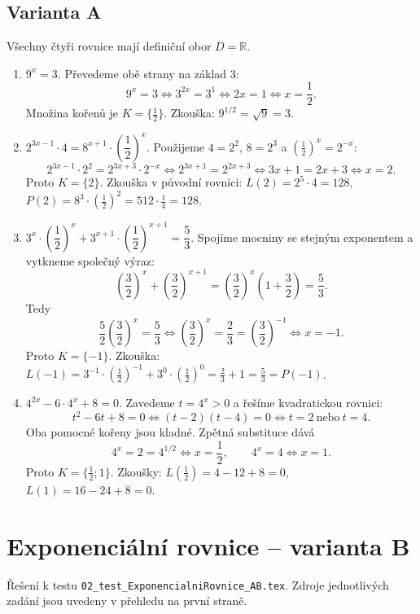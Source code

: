 \documentclass[a4paper,10pt]{article}
\begin{document}
\subsection*{Varianta A}
Všechny čtyři rovnice mají definiční obor $D=\mathbb{R}$.
\begin{enumerate}
\item $9^x = 3$.
Převedeme obě strany na základ $3$:
\[
9^x=3 \iff 3^{2x}=3^1 \iff 2x=1 \iff x=\frac12.
\]
Množina kořenů je $K=\{\frac12\}$.
Zkouška: $9^{1/2}=\sqrt{9}=3$.

\item $2^{3x-1} \cdot 4 = 8^{x+1} \cdot \left(\dfrac{1}{2}\right)^{x}$.
Použijeme $4=2^2$, $8=2^3$ a $(\frac12)^x=2^{-x}$:
\[
2^{3x-1}\cdot2^2=2^{3x+3}\cdot2^{-x}
\iff 2^{3x+1}=2^{2x+3}
\iff 3x+1=2x+3 \iff x=2.
\]
Proto $K=\{2\}$.
Zkouška v původní rovnici: $L(2)=2^5\cdot4=128$,
$P(2)=8^3\cdot(\frac12)^2=512\cdot\frac14=128$.

\item $3^{x} \cdot \left(\dfrac{1}{2}\right)^{x} + 3^{x+1} \cdot \left(\dfrac{1}{2}\right)^{x+1} = \dfrac{5}{3}$.
Spojíme mocniny se stejným exponentem a vytkneme společný výraz:
\[
\left(\frac32\right)^x+\left(\frac32\right)^{x+1}
=\left(\frac32\right)^x\left(1+\frac32\right)=\frac53.
\]
Tedy
\[
\frac52\left(\frac32\right)^x=\frac53
\iff \left(\frac32\right)^x=\frac23
=\left(\frac32\right)^{-1} \iff x=-1.
\]
Proto $K=\{-1\}$.
Zkouška: $L(-1)=3^{-1}\cdot(\frac12)^{-1}+3^0\cdot(\frac12)^0
=\frac23+1=\frac53=P(-1)$.

\item $4^{2x} - 6 \cdot 4^{x} + 8 = 0$.
Zavedeme $t=4^x>0$ a řešíme kvadratickou rovnici:
\[
t^2-6t+8=0 \iff (t-2)(t-4)=0 \iff t=2\ \text{nebo}\ t=4.
\]
Oba pomocné kořeny jsou kladné. Zpětná substituce dává
\[
4^x=2=4^{1/2} \iff x=\frac12,
\qquad 4^x=4 \iff x=1.
\]
Proto $K=\{\frac12;1\}$.
Zkoušky: $L(\frac12)=4-12+8=0$, $L(1)=16-24+8=0$.
\end{enumerate}

\newpage
\section*{Exponenciální rovnice -- varianta B}
Řešení k testu \texttt{02\_test\_ExponencialniRovnice\_AB.tex}.
Zdroje jednotlivých zadání jsou uvedeny v přehledu na první straně.
\end{document}
